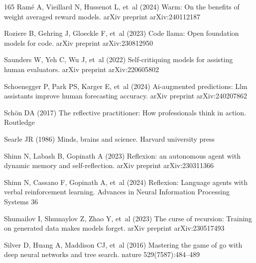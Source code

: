 \documentclass[sn-basic, Numbered]{sn-jnl}%
\theoremstyle{thmstyleone}%
\theoremstyle{thmstyletwo}%
\theoremstyle{thmstylethree}%
\begin{document}
\begin{thebibliography}{165}
Ram{\'e} A, Vieillard N, Hussenot L, et~al (2024) Warm: On the benefits of weight averaged reward models. arXiv preprint arXiv:240112187

Roziere B, Gehring J, Gloeckle F, et~al (2023) Code llama: Open foundation models for code. arXiv preprint arXiv:230812950

Saunders W, Yeh C, Wu J, et~al (2022) Self-critiquing models for assisting human evaluators. arXiv preprint arXiv:220605802

Schoenegger P, Park PS, Karger E, et~al (2024) Ai-augmented predictions: Llm assistants improve human forecasting accuracy. arXiv preprint arXiv:240207862

Sch{\"o}n DA (2017) The reflective practitioner: How professionals think in action. Routledge

Searle JR (1986) Minds, brains and science. Harvard university press

Shinn N, Labash B, Gopinath A (2023) Reflexion: an autonomous agent with dynamic memory and self-reflection. arXiv preprint arXiv:230311366

Shinn N, Cassano F, Gopinath A, et~al (2024) Reflexion: Language agents with verbal reinforcement learning. Advances in Neural Information Processing Systems 36

Shumailov I, Shumaylov Z, Zhao Y, et~al (2023) The curse of recursion: Training on generated data makes models forget. arXiv preprint arXiv:230517493

Silver D, Huang A, Maddison CJ, et~al (2016) Mastering the game of go with deep neural networks and tree search. nature 529(7587):484--489


\end{thebibliography}
\end{document}
